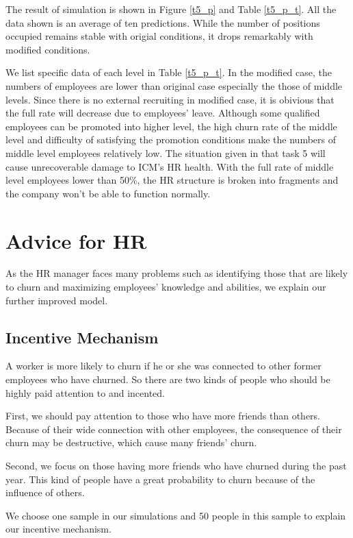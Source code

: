 \documentclass[12pt,a4paper,titlepage]{article}
\begin{document}
The result of simulation is shown in Figure \ref{t5_p} and Table \ref{t5_p_t}. All the data shown is an average of ten predictions. While the number of positions occupied remains stable with origial conditions, it drops remarkably with modified conditions.

We list specific data of each level in Table \ref{t5_p_t}. In the modified case, the numbers of employees are lower than original case especially the those of middle levels. Since there is no external recruiting in modified case, it is obivious that the full rate will decrease due to employees' leave. Although some qualified employees can be promoted into higher level, the high churn rate of the middle level and difficulty of satisfying the promotion conditions make the numbers of middle level employees relatively low. The situation given in that task 5 will cause unrecoverable damage to ICM's HR health. With the full rate of middle level employees lower than 50\%, the HR structure is broken into fragments and the company won't be able to function normally.


\section{Advice for HR}
\label{sec:advice-for-hr}

As the HR manager faces many problems such as identifying those that
are likely to churn and maximizing employees' knowledge and
abilities, we explain our further improved model.

\subsection{Incentive Mechanism}
\label{sec:incentive-machanism}

A worker is more likely to churn if he or she was connected to other
former employees who have churned. So there are two kinds of people
who should be highly paid attention to and incented.

First, we should pay attention to those who have more friends than
others. Because of their wide connection with other employees, the
consequence of their churn may be destructive, which cause many
friends' churn.

Second, we focus on those having more friends who have churned
during the past year. This kind of people have a great probability to
churn because of the influence of others.

We choose one sample in our simulations and 50 people in this sample
to explain our incentive mechanism.
\end{document}
